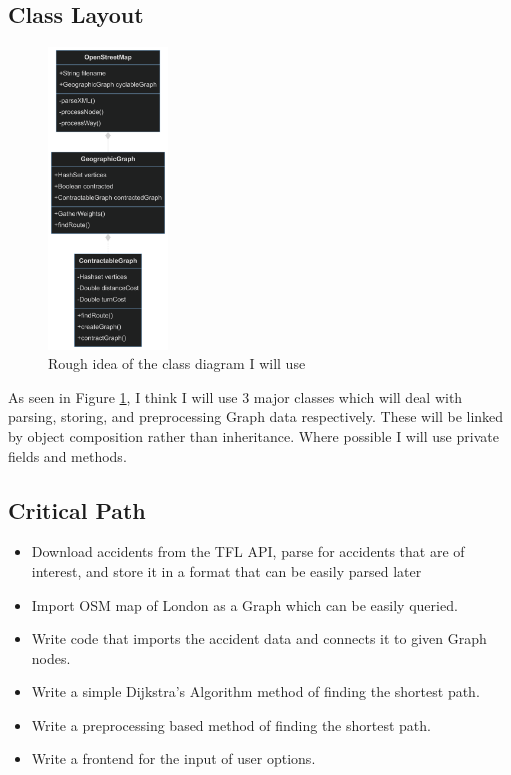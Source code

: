 \documentclass[11pt,twoside,a4paper]{article}
\begin{document}
\subsection{Class Layout}
\begin{figure}[t]
    \begin{center}
    \includegraphics[height=8cm]{classdiagram.png}
    \end{center}
    \caption{Rough idea of the class diagram I will use}
    \label{Class Diagram Simple}
\end{figure}
As seen in Figure \ref{Class Diagram Simple}, I think I will use 3 major classes which will deal with parsing, storing, and preprocessing Graph data respectively. These will be linked by object composition
rather than inheritance. Where possible I will use private fields and methods. 
\subsection{Critical Path}
\begin{itemize} 
    \item Download accidents from the TFL API, parse for accidents that are of interest, and store it in a format that can be easily parsed later
    \item Import OSM map of London as a Graph which can be easily queried.
    \item Write code that imports the accident data and connects it to given Graph nodes.
    \item Write a simple Dijkstra's Algorithm method of finding the shortest path.
    \item Write a preprocessing based method of finding the shortest path.
    \item Write a frontend for the input of user options.
\end{itemize}
\newpage
\end{document}
